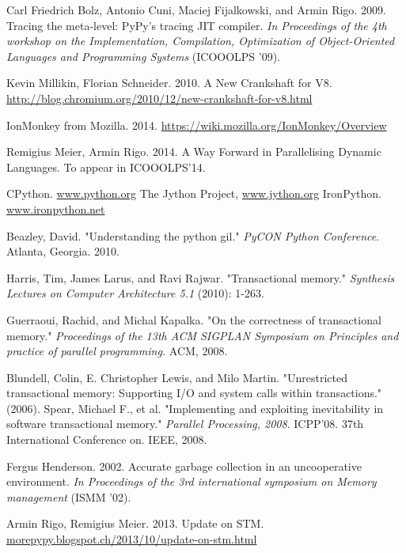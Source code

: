 \documentclass{sigplanconf}
\begin{document}
\begin{thebibliography}{}
\softraggedright

 Carl Friedrich Bolz, Antonio Cuni, Maciej
  Fijalkowski, and Armin Rigo. 2009. Tracing the meta-level: PyPy's
  tracing JIT compiler.  \emph{In Proceedings of the 4th workshop on the
    Implementation, Compilation, Optimization of Object-Oriented Languages
    and Programming Systems} (ICOOOLPS '09).

 Kevin Millikin, Florian Schneider. 2010.  A New
  Crankshaft for V8.
  \url{http://blog.chromium.org/2010/12/new-crankshaft-for-v8.html}

 IonMonkey from Mozilla. 2014.
  \url{https://wiki.mozilla.org/IonMonkey/Overview}

 Remigius Meier, Armin Rigo. 2014. A Way Forward
  in Parallelising Dynamic Languages. To appear in ICOOOLPS'14.

 CPython. \url{www.python.org}
 The Jython Project, \url{www.jython.org}
 IronPython. \url{www.ironpython.net}

 Beazley, David. "Understanding the python gil."
  \emph{PyCON Python Conference}. Atlanta, Georgia. 2010.

 Harris, Tim, James Larus, and Ravi
  Rajwar. "Transactional memory." \emph{Synthesis Lectures on Computer
  Architecture 5.1} (2010): 1-263.

 Guerraoui, Rachid, and Michal Kapalka. "On the
  correctness of transactional memory." \emph{Proceedings of the 13th
    ACM SIGPLAN Symposium on Principles and practice of parallel
    programming.} ACM, 2008.

 Blundell, Colin, E. Christopher Lewis, and Milo
  Martin. "Unrestricted transactional memory: Supporting I/O and system
  calls within transactions." (2006).
 Spear, Michael F., et al. "Implementing and
  exploiting inevitability in software transactional memory."
  \emph{Parallel Processing, 2008}. ICPP'08. 37th International
  Conference on. IEEE, 2008.

 Fergus Henderson. 2002. Accurate garbage collection
  in an uncooperative environment. \emph{In Proceedings of the 3rd
    international symposium on Memory management} (ISMM '02).

 Armin Rigo, Remigius Meier. 2013. Update on
  STM. \url{morepypy.blogspot.ch/2013/10/update-on-stm.html}


\end{thebibliography}
\end{document}
